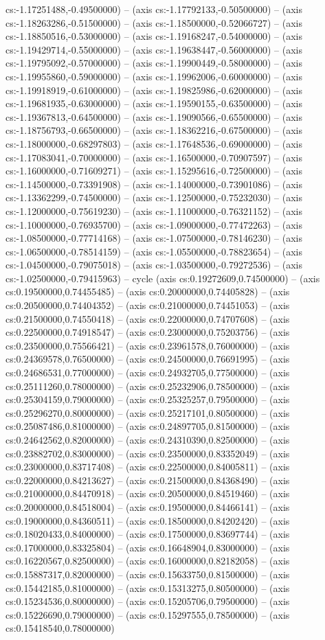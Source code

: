 cs:-1.17251488,-0.49500000) -- (axis cs:-1.17792133,-0.50500000) -- (axis cs:-1.18263286,-0.51500000) -- (axis cs:-1.18500000,-0.52066727) -- (axis cs:-1.18850516,-0.53000000) -- (axis cs:-1.19168247,-0.54000000) -- (axis cs:-1.19429714,-0.55000000) -- (axis cs:-1.19638447,-0.56000000) -- (axis cs:-1.19795092,-0.57000000) -- (axis cs:-1.19900449,-0.58000000) -- (axis cs:-1.19955860,-0.59000000) -- (axis cs:-1.19962006,-0.60000000) -- (axis cs:-1.19918919,-0.61000000) -- (axis cs:-1.19825986,-0.62000000) -- (axis cs:-1.19681935,-0.63000000) -- (axis cs:-1.19590155,-0.63500000) -- (axis cs:-1.19367813,-0.64500000) -- (axis cs:-1.19090566,-0.65500000) -- (axis cs:-1.18756793,-0.66500000) -- (axis cs:-1.18362216,-0.67500000) -- (axis cs:-1.18000000,-0.68297803) -- (axis cs:-1.17648536,-0.69000000) -- (axis cs:-1.17083041,-0.70000000) -- (axis cs:-1.16500000,-0.70907597) -- (axis cs:-1.16000000,-0.71609271) -- (axis cs:-1.15295616,-0.72500000) -- (axis cs:-1.14500000,-0.73391908) -- (axis cs:-1.14000000,-0.73901086) -- (axis cs:-1.13362299,-0.74500000) -- (axis cs:-1.12500000,-0.75232030) -- (axis cs:-1.12000000,-0.75619230) -- (axis cs:-1.11000000,-0.76321152) -- (axis cs:-1.10000000,-0.76935700) -- (axis cs:-1.09000000,-0.77472263) -- (axis cs:-1.08500000,-0.77714168) -- (axis cs:-1.07500000,-0.78146230) -- (axis cs:-1.06500000,-0.78514159) -- (axis cs:-1.05500000,-0.78823654) -- (axis cs:-1.04500000,-0.79075018) -- (axis cs:-1.03500000,-0.79272536) -- (axis cs:-1.02500000,-0.79415963) -- cycle (axis cs:0.19272609,0.74500000) -- (axis cs:0.19500000,0.74455485) -- (axis cs:0.20000000,0.74405828) -- (axis cs:0.20500000,0.74404352) -- (axis cs:0.21000000,0.74451053) -- (axis cs:0.21500000,0.74550418) -- (axis cs:0.22000000,0.74707608) -- (axis cs:0.22500000,0.74918547) -- (axis cs:0.23000000,0.75203756) -- (axis cs:0.23500000,0.75566421) -- (axis cs:0.23961578,0.76000000) -- (axis cs:0.24369578,0.76500000) -- (axis cs:0.24500000,0.76691995) -- (axis cs:0.24686531,0.77000000) -- (axis cs:0.24932705,0.77500000) -- (axis cs:0.25111260,0.78000000) -- (axis cs:0.25232906,0.78500000) -- (axis cs:0.25304159,0.79000000) -- (axis cs:0.25325257,0.79500000) -- (axis cs:0.25296270,0.80000000) -- (axis cs:0.25217101,0.80500000) -- (axis cs:0.25087486,0.81000000) -- (axis cs:0.24897705,0.81500000) -- (axis cs:0.24642562,0.82000000) -- (axis cs:0.24310390,0.82500000) -- (axis cs:0.23882702,0.83000000) -- (axis cs:0.23500000,0.83352049) -- (axis cs:0.23000000,0.83717408) -- (axis cs:0.22500000,0.84005811) -- (axis cs:0.22000000,0.84213627) -- (axis cs:0.21500000,0.84368490) -- (axis cs:0.21000000,0.84470918) -- (axis cs:0.20500000,0.84519460) -- (axis cs:0.20000000,0.84518004) -- (axis cs:0.19500000,0.84466141) -- (axis cs:0.19000000,0.84360511) -- (axis cs:0.18500000,0.84202420) -- (axis cs:0.18020433,0.84000000) -- (axis cs:0.17500000,0.83697744) -- (axis cs:0.17000000,0.83325804) -- (axis cs:0.16648904,0.83000000) -- (axis cs:0.16220567,0.82500000) -- (axis cs:0.16000000,0.82182058) -- (axis cs:0.15887317,0.82000000) -- (axis cs:0.15633750,0.81500000) -- (axis cs:0.15442185,0.81000000) -- (axis cs:0.15313275,0.80500000) -- (axis cs:0.15234536,0.80000000) -- (axis cs:0.15205706,0.79500000) -- (axis cs:0.15226690,0.79000000) -- (axis cs:0.15297555,0.78500000) -- (axis cs:0.15418540,0.78000000) 